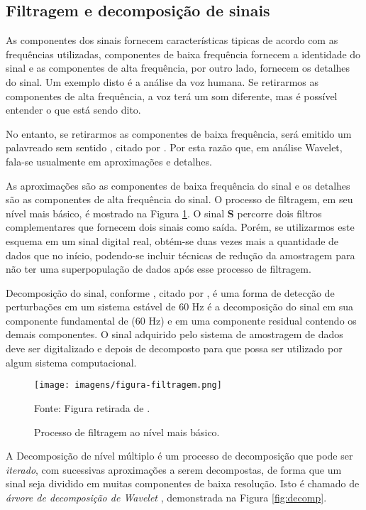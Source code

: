 \subsection{Filtragem e decomposição de sinais}
\par
As componentes dos sinais fornecem características tipicas de acordo com as frequências utilizadas, componentes de baixa frequência fornecem a identidade do sinal e as componentes de alta frequência, por outro lado, fornecem os detalhes do sinal. Um exemplo disto é a análise da voz humana. Se retirarmos as componentes de alta frequência, a voz terá um som diferente, mas é possível entender o que está sendo dito.
\par
No entanto, se retirarmos as componentes de baixa frequência, será emitido um palavreado sem sentido \cite{MIS96}, citado por \cite{DEL03}. Por esta razão que, em análise Wavelet, fala-se usualmente em aproximações e detalhes.
\par
As aproximações são as componentes de baixa frequência do sinal e os detalhes são as componentes de alta frequência do sinal. O processo de filtragem, em seu nível mais básico, é mostrado na Figura \ref{fig:filtragem}. O sinal \textbf{S} percorre dois filtros complementares que fornecem dois sinais como saída. Porém, se utilizarmos este esquema em um sinal digital real, obtém-se duas vezes mais a quantidade de dados que no início, podendo-se incluir técnicas de redução da amostragem para não ter uma superpopulação de dados após esse processo de filtragem. 
\par 
Decomposição do sinal, conforme \cite{JUN09}, citado por \cite{BAC11}, é uma forma de detecção de perturbações em um sistema estável de 60 Hz é a decomposição do sinal em sua componente fundamental de (60 Hz) e em uma componente residual contendo os demais componentes. O sinal adquirido pelo sistema de amostragem de dados deve ser digitalizado e depois de decomposto para que possa ser utilizado por algum sistema computacional.
\begin{figure}[!h]
\begin{center}
\caption{Processo de filtragem ao nível mais básico.}
\texttt{[image: imagens/figura-filtragem.png]}
\par{\small Fonte: Figura retirada de \cite{MEN08}.}
\label{fig:filtragem}
\end{center}
\end{figure}
\par
A Decomposição de nível múltiplo é um processo de decomposição que pode ser \emph{iterado}, com sucessivas aproximações a serem decompostas, de forma que um sinal seja dividido em muitas componentes de baixa resolução. Isto é chamado de \emph{árvore de decomposição de Wavelet} \citep{MEN08}, demonstrada na Figura \ref{fig:decomp}.

